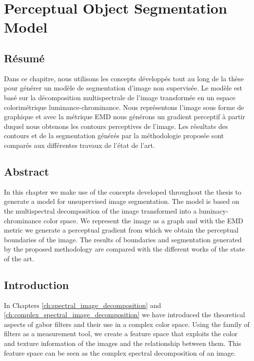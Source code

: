 
\chapter{Perceptual Object Segmentation Model} \label{ch:perceptual_object_boundaries_detection}

\section*{Résumé}
\noindent Dans ce chapitre, nous utilisons les concepts développés tout au long de la thèse pour générer un modèle de segmentation d'image non supervisée. Le modèle est basé sur la décomposition multispectrale de l'image transformée en un espace colorimétrique luminance-chrominance. Nous représentons l'image sous forme de graphique et avec la métrique EMD nous générons un gradient perceptif à partir duquel nous obtenons les contours perceptives de l'image. Les résultats des contours et de la segmentation générés par la méthodologie proposée sont comparés aux différentes travaux de l'état de l'art.
\section*{Abstract}
\noindent In this chapter we make use of the concepts developed throughout the thesis to generate a model for unsupervised image segmentation. The model is based on the multispectral decomposition of the image transformed into a luminacy-chrominance color space. We represent the image as a graph and with the EMD metric we generate a perceptual gradient from which we obtain the perceptual boundaries of the image. The results of boundaries and segmentation generated by the proposed methodology are compared with the different works of the state of the art.

\section{Introduction}
In Chapters \ref{ch:spectral_image_decomposition} and \ref{ch:complex_spectral_image_decomposition} we have introduced the theoretical aspects of gabor filters and their use in a complex color space. Using the family of filters as a measurement tool, we create a feature space that exploits the color and texture information of the images and the relationship between them. This feature space can be seen as the complex spectral decomposition of an image.

